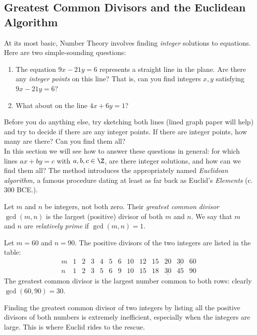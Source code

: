 \subsection{Greatest Common Divisors and the Euclidean Algorithm}

At its most basic, Number Theory involves finding \emph{integer} solutions to equations. Here are two simple-sounding questions:
\begin{enumerate}
  \item The equation $9x-21y=6$ represents a straight line in the plane. Are there any \emph{integer points} on this line? That is, can you find integers $x,y$ satisfying $9x-21y=6$?
  \item What about on the line $4x+6y=1$?
\end{enumerate}
Before you do anything else, try sketching both lines (lined graph paper will help) and try to decide if there are any integer points. If there are integer points, how many are there? Can you find them all?\\

In this section we will see how to answer these questions in general: for which lines $ax+by=c$ with $a,b,c\in\Z$, are there integer solutions, and how can we find them all? The method introduces the appropriately named \emph{Euclidean algorithm,} a famous procedure dating at least as far back as Euclid's \emph{Elements} (c. 300 BCE.).

\begin{defn}
Let $m$ and $n$ be integers, not both zero. Their \emph{greatest common divisor} $\gcd(m,n)$ is the largest (positive) divisor of both $m$ and $n$. We say that $m$ and $n$ are \emph{relatively prime} if $\gcd(m,n)=1$.
\end{defn}

\begin{example}
Let $m=60$ and $n=90$. The positive divisors of the two integers are listed in the table:
\[\begin{array}{c|cccccccccccc}
m&1&2&3&4&5&6&10&12&15&20&\underline{30}&60\\\hline
n&1&2&3&5&6&9&10&15&18&\underline{30}&45&90
\end{array}\]
The greatest common divisor is the largest number common to both rows: clearly $\gcd(60,90)=30$.
\end{example}

Finding the greatest common divisor of two integers by listing all the positive divisors of both numbers is extremely inefficient, especially when the integers are large. This is where Euclid rides to the rescue.\\

